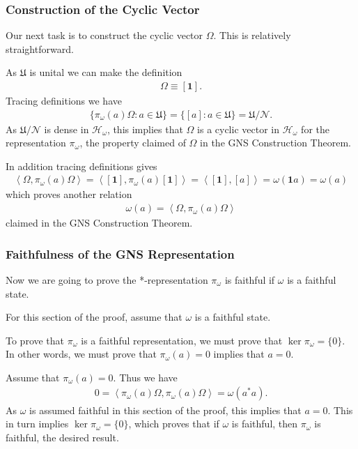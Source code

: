 \subsubsection{Construction of the Cyclic Vector}
Our next task is to construct the cyclic vector $\Omega$. This is relatively straightforward.

As $\mathfrak{U}$ is unital we can make the definition
\begin{align}
    \Omega \equiv [\mathbf{1}].
\end{align}
Tracing definitions we have
\begin{align}
    \{\pi_\omega(a)\Omega : a \in \mathfrak{U}\} = \{[a] : a \in \mathfrak{U}\} = \mathfrak{U} / \mathcal{N}.
\end{align}
As $\mathfrak{U} / \mathcal{N}$ is dense in $\mathcal{H}_\omega$, this implies that $\Omega$ is a cyclic vector in $\mathcal{H}_\omega$ for the representation $\pi_\omega$, the property claimed of $\Omega$ in the GNS Construction Theorem.

In addition tracing definitions gives
\begin{align}
    \left<\Omega, \pi_\omega(a)\Omega\right> = \left<[\mathbf{1}], \pi_\omega(a)[\mathbf{1}]\right> = \left<[\mathbf{1}], [a]\right> = \omega(\mathbf{1}a) = \omega(a)
\end{align}
which proves another relation
\begin{align}
    \omega(a) = \left<\Omega, \pi_\omega(a)\Omega\right>
\end{align}
claimed in the GNS Construction Theorem.

\subsubsection{Faithfulness of the GNS Representation}
Now we are going to prove the *-representation $\pi_\omega$ is faithful if $\omega$ is a faithful state.

For this section of the proof, assume that $\omega$ is a faithful state.

To prove that $\pi_\omega$ is a faithful representation, we must prove that $\ker \pi_\omega = \{0\}$. In other words, we must prove that $\pi_\omega(a) = 0$ implies that $a=0$.

Assume that $\pi_\omega(a) = 0$. Thus we have
\begin{align}
    0 = \left<\pi_\omega(a)\Omega, \pi_\omega(a)\Omega\right> = \omega(a^*a).
\end{align}
As $\omega$ is assumed faithful in this section of the proof, this implies that $a=0$. This in turn implies $\ker \pi_\omega = \{0\}$, which proves that if $\omega$ is faithful, then $\pi_\omega$ is faithful, the desired result.

